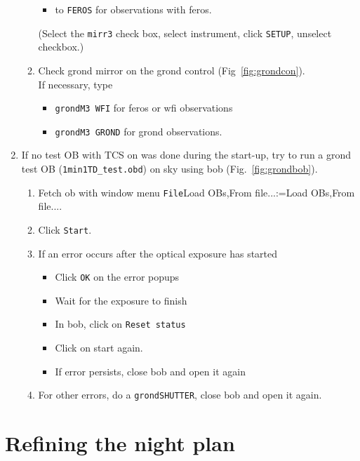 \documentclass[11pt,fleqn]{book} %
\makeatletter
\def\menu#1#2{\texttt{#1}\ifx{}#2\else\@for\@x:=#2\do{$\rightarrow$\texttt{\@x}}\fi}
\def\wmenu#1#2{window menu \menu{#1}{#2}}
\def\fetchob{\wmenu{File}{Load OBs,From file...}}
\makeatother
\begin{document}
\begin{enumerate}
\begin{enumerate}
\begin{itemize}
                \item to \texttt{FEROS} for observations with \gls{feros}.
              \end{itemize}
              (Select the \texttt{mirr3} check box, select instrument, click \texttt{SETUP}, unselect checkbox.)
        \item Check \gls{grond} mirror on the \gls{grond} control (Fig~\ref{fig:grondcon}).\\
              If necessary, type 
              \begin{itemize}
                  \item \texttt{grondM3 WFI} for \gls{feros} or \gls{wfi} observations
                  \item \texttt{grondM3 GROND} for \gls{grond} observations.
              \end{itemize}
     \end{enumerate}
  \item If no test OB with TCS on was done during the start-up, try to run a \gls{grond} test OB (\texttt{1min1TD\_test.obd}) on sky using \gls{bob} (Fig.~\ref{fig:grondbob}).
     \begin{enumerate}
       \item Fetch \gls{ob} with \fetchob.
       \item Click \texttt{Start}.      
       \item If an error occurs after the optical exposure has started
             \begin{itemize}
                \item Click \texttt{OK} on the error popups
                \item Wait for the exposure to finish
                \item In \gls{bob}, click on \texttt{Reset status}
                \item Click on start again.
                \item If error persists, close \gls{bob} and open it again
             \end{itemize} 
       \item For other errors, do a \texttt{grondSHUTTER}, close bob and open it again.
     \end{enumerate}
\end{enumerate}

\section{Refining the night plan}
\end{document}
